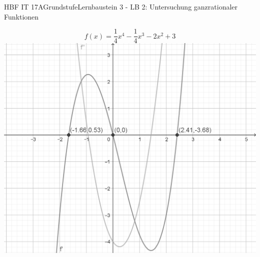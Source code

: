 \documentclass[oneside,openany,headings=optiontotoc,11pt,numbers=noenddot]{scrreprt}
\begin{document}
	\begin{worksheet}{HBF IT 17A}{Grundstufe}{Lernbaustein 3 - LB 2: Untersuchung ganzrationaler Funktionen}

		\begin{framed}
			\noindent
			\[f(x) = \frac{1}{4}x^4 - \frac{1}{4}x^3 - 2x^2 + 3\]
			\includegraphics[scale=0.6]{Bilder/HOPTIP_f'f''.png}
		\end{framed}
	

\end{worksheet}
\end{document}
